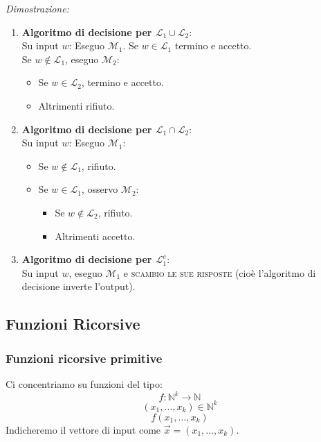 \textit{Dimostrazione:}
\begin{enumerate}
    \item \textbf{Algoritmo di decisione per $\mathcal{L}_1 \cup \mathcal{L}_2$}: \\
    Su input $w$: Eseguo $\mathcal{M}_1$. Se $w \in \mathcal{L}_1$ termino e accetto. \\
    Se $w \notin \mathcal{L}_1$, eseguo $\mathcal{M}_2$:
    \begin{itemize}
        \item Se $w \in \mathcal{L}_2$, termino e accetto.
        \item Altrimenti rifiuto.
    \end{itemize}
    
    \item \textbf{Algoritmo di decisione per $\mathcal{L}_1 \cap \mathcal{L}_2$}: \\
    Su input $w$: Eseguo $\mathcal{M}_1$:
    \begin{itemize}
        \item Se $w \notin \mathcal{L}_1$, rifiuto.
        \item Se $w \in \mathcal{L}_1$, osservo $\mathcal{M}_2$:
        \begin{itemize}
            \item Se $w \notin \mathcal{L}_2$, rifiuto.
            \item Altrimenti accetto.
        \end{itemize}
    \end{itemize}
    
    \item \textbf{Algoritmo di decisione per $\mathcal{L}_1^c$}: \\
    Su input $w$, eseguo $\mathcal{M}_1$ e \textsc{scambio le sue risposte} (cioè l'algoritmo di decisione inverte l'output).
\end{enumerate}

\vspace{0.6cm}
\subsection{Funzioni Ricorsive}
\subsubsection{Funzioni ricorsive primitive}

Ci concentriamo su funzioni del tipo:
$$f: \mathbb{N}^k \to \mathbb{N}$$
$$(x_1, \dots, x_k) \in \mathbb{N}^k$$
$$f(x_1, \dots, x_k)$$
Indicheremo il vettore di input come $\vec{x} = (x_1, \dots, x_k)$.

